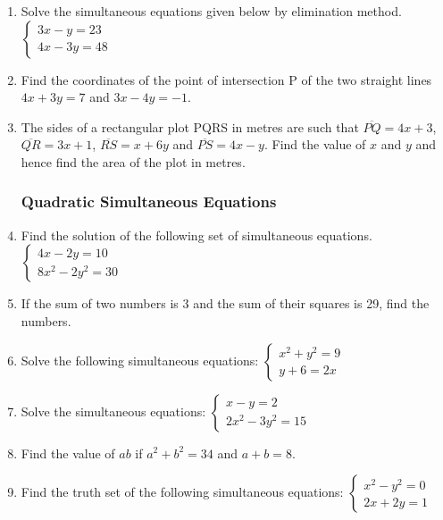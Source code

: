 \begin{enumerate}
	\item Solve the simultaneous equations given below by elimination method.
	$\left\{
	\begin{array}{l}
	3x - y = 23\\
	4x - 3y = 48
	\end{array} \right.$
	
	\item Find the coordinates of the point of intersection P of the two straight lines $4x + 3y = 7$ and $3x - 4y = -1$.

	\item The sides of a rectangular plot PQRS in metres are such that $\overline{PQ} = 4x + 3$, $\overline{QR} = 3x + 1$, $\overline{RS} = x + 6y$ and $\overline{PS} = 4x - y$. Find the value of $x$ and $y$ and hence find the area of the plot in metres.
	
			\subsubsection{Quadratic Simultaneous Equations} \label{quadsimeqns}
\item Find the solution of the following set of simultaneous equations.
	$\left\{
	\begin{array}{l}
	4x - 2y = 10\\
	8x^2 - 2y^2 = 30
	\end{array} \right.$
	
	\item If the sum of two numbers is 3 and the sum of their squares is 29, find the numbers.
	
	\item Solve the following simultaneous equations:
		$\left\{
	\begin{array}{l}
	x^2 + y^2 = 9\\
	y + 6 = 2x
	\end{array} \right.$
	
	\item Solve the simultaneous equations:
	$\left\{
	\begin{array}{l}
	x - y = 2\\
	2x^2 - 3y^2 = 15
	\end{array} \right.$
	
	\item Find the value of $ab$ if $a^2 + b^2 = 34$ and $a + b = 8$.

	\item Find the truth set of the following simultaneous equations:
	$\left\{
	\begin{array}{l}
	x^2 - y^2 = 0\\
	2x + 2y = 1
	\end{array} \right.$
	

\end{enumerate}
